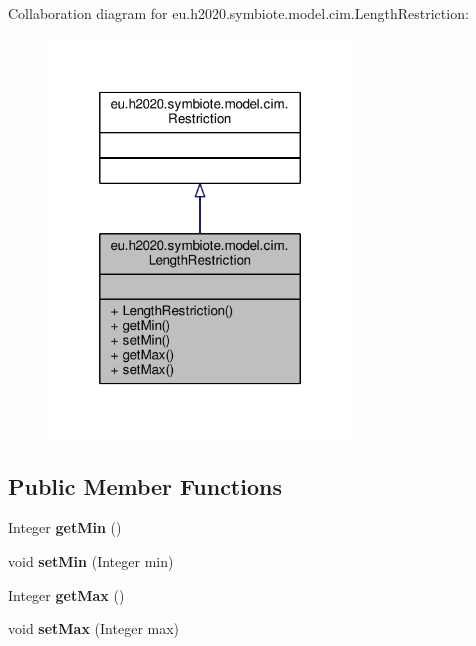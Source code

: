 Collaboration diagram for eu.\+h2020.\+symbiote.\+model.\+cim.\+Length\+Restriction\+:
\nopagebreak
\begin{figure}[H]
\begin{center}
\leavevmode
\includegraphics[width=228pt]{classeu_1_1h2020_1_1symbiote_1_1model_1_1cim_1_1LengthRestriction__coll__graph}
\end{center}
\end{figure}
\subsection*{Public Member Functions}
\begin{DoxyCompactItemize}
\item 
\mbox{\label{classeu_1_1h2020_1_1symbiote_1_1model_1_1cim_1_1LengthRestriction_a45fbccf2d09db36baefe19d798fcb83c}} 
Integer {\bfseries get\+Min} ()
\item 
\mbox{\label{classeu_1_1h2020_1_1symbiote_1_1model_1_1cim_1_1LengthRestriction_afa1740aa87cc963493da45b8673622de}} 
void {\bfseries set\+Min} (Integer min)
\item 
\mbox{\label{classeu_1_1h2020_1_1symbiote_1_1model_1_1cim_1_1LengthRestriction_ae170ca5d8e08fa9f82ce8874d49b053f}} 
Integer {\bfseries get\+Max} ()
\item 
\mbox{\label{classeu_1_1h2020_1_1symbiote_1_1model_1_1cim_1_1LengthRestriction_a85e3059f5b42cd2f746e7d25e36d694e}} 
void {\bfseries set\+Max} (Integer max)
\end{DoxyCompactItemize}


